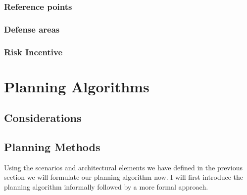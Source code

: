 \subsection{Reference points}
	
\subsection{Defense areas}

\subsection{Risk Incentive}


% 
%
%
%
%

\chapter{Planning Algorithms}

\section{Considerations}

\section{Planning Methods}

%
%
%
%
\label{sec:PlanningAlgorithm} 
  
 Using the scenarios and architectural elements we have defined in the previous section we will formulate our planning algorithm now.
 I will first introduce the planning algorithm informally followed by a more formal approach.
      
  



